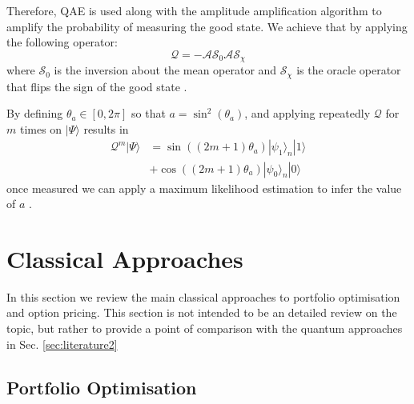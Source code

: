 \documentclass[prx,twocolumn,floatfix,superscriptaddress,longbibliography]{revtex4-1}
\begin{document}
Therefore, QAE is used along with the amplitude amplification algorithm to amplify the probability of measuring the good state. We achieve that by applying the following operator: 
\begin{equation}
  \label{eq:18}
  \mathcal{Q} = -\mathcal{A} \mathcal{S}_0 \mathcal{A} \mathcal{S}_{\chi}
\end{equation}
where $\mathcal{S}_0$ is the inversion about the mean operator and $\mathcal{S}_{\chi}$ is the oracle operator that flips the sign of the good state \cite{Suzuki2020}.

By defining $\theta_a \in [0, 2\pi]$  so that $a = \sin^2(\theta_a)$, and applying repeatedly $\mathcal{Q}$ for $m$ times on $|\Psi\rangle$  results in
\begin{equation}
  \label{eq:19}
\begin{aligned}
  \mathcal{Q}^m |\Psi\rangle  &= \sin((2m + 1)\theta_a)|\psi_1\rangle_n|1\rangle\\
  & + \cos((2m + 1)\theta_a)|\psi_0\rangle_n|0\rangle 
\end{aligned}
\end{equation}
once measured we can apply a maximum likelihood estimation to infer the value of $a$ \cite{Suzuki2020}.

\section{Classical Approaches}\label{sec:literature1}

In this section we review the main classical approaches to portfolio optimisation and option pricing. 
This section is not intended to be an detailed review on the topic, but rather to provide a point of comparison with the quantum approaches in Sec. \ref{sec:literature2}

\subsection{Portfolio Optimisation}
\end{document}
